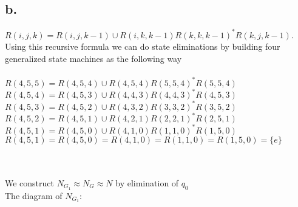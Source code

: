 \documentclass[12pt]{article}
\begin{document}
\subsection*{b.}
$R(i,j,k)=R(i,j,k-1)\cup R(i,k,k-1)R(k,k,k-1)^*R(k,j,k-1)$. Using this recursive formula we can do state eliminations by building four generalized state machines as the following way \\ \\ 
$R(4,5,5)=R(4,5,4)\cup R(4,5,4)R(5,5,4)^*R(5,5,4)$ \\
$R(4,5,4)=R(4,5,3)\cup R(4,4,3)R(4,4,3)^*R(4,5,3)$ \\
$R(4,5,3)=R(4,5,2)\cup R(4,3,2)R(3,3,2)^*R(3,5,2)$ \\
$R(4,5,2)=R(4,5,1)\cup R(4,2,1)R(2,2,1)^*R(2,5,1)$ \\
$R(4,5,1)=R(4,5,0)\cup R(4,1,0)R(1,1,0)^*R(1,5,0)$ \\
$R(4,5,1)=R(4,5,0)=R(4,1,0)=R(1,1,0)=R(1,5,0)=\{e\}$ \\ \\ \\ \par
We construct $N_{G_1}\approx N_G \approx N$ by elimination of $q_0$\\
The diagram of $N_{G_1}:$
\end{document}
